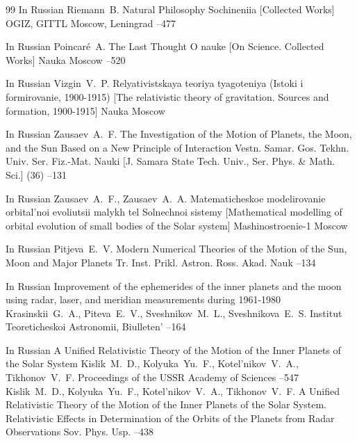 \begin{thebibliography}{99}
\lang In Russian
\by Riemann~B.
\paper Natural Philosophy
\inbook  Sochineniia \rm [Collected Works]
\publ OGIZ, GITTL
\publaddr Moscow, Leningrad
–477

\lang In Russian
\by Poincar\'e~A.
\paper The Last Thought
\inbook O nauke \rm  [On Science. Collected Works]
\publ Nauka
\publaddr Moscow
–520 

\lang In Russian
\by Vizgin~V.~P.
\book Relyativistskaya teoriya tyagoteniya (Istoki i formirovanie, 1900-1915) \rm [The relativistic theory of gravitation. Sources and formation, 1900-1915]
\publ Nauka
\publaddr Moscow

\lang In Russian
\by Zausaev~A.~F.
\paper The Investigation of the Motion of Planets, the Moon, and the Sun Based on a New Principle of Interaction
\jour Vestn. Samar. Gos. Tekhn. Univ. Ser. Fiz.-Mat. Nauki \rm [J. Samara State Tech. Univ., Ser. Phys. \& Math. Sci.]
(36)
--131


\lang In Russian
\by Zausaev~A.~F., Zausaev~A.~A.
\book Matematicheskoe modelirovanie orbital'noi evoliutsii malykh tel Solnechnoi sistemy \rm [Mathematical modelling of orbital evolution of small bodies of the Solar system]
\publaddr Mashinostroenie-1
\publ Moscow


\lang In Russian
\by Pitjeva~E.~V.
\paper Modern Numerical Theories of the Motion of the Sun, Moon and Major Planets
\jour Tr. Inst. Prikl. Astron. Ross. Akad. Nauk
–134



\lang In Russian
\paper Improvement of the ephemerides of the inner planets and the moon using radar, laser, and meridian measurements during 1961-1980
\by Krasinskii~G.~A., Piteva~E.~V., Sveshnikov~M.~L., Sveshnikova~E.~S.
\jour Institut Teoreticheskoi Astronomii, Biulleten'
--164
	
	
\lang In Russian
\paper A Unified Relativistic Theory of the Motion of the Inner Planets of the Solar System
\by \by Kislik~M.~D., Kolyuka~Yu.~F., Kotel'nikov~V.~A., Tikhonov~V.~F.
\jour  Proceedings of the USSR Academy of Sciences 
--547
\moreref
\by Kislik~M.~D., Kolyuka~Yu.~F., Kotel'nikov~V.~A., Tikhonov~V.~F.
\paper A Unified Relativistic Theory of the Motion of the Inner Planets of the Solar System. Relativistic Effects in Determination of the Orbits of the Planets from Radar Observations
\jour Sov. Phys. Usp. 
–438 




\end{thebibliography}
